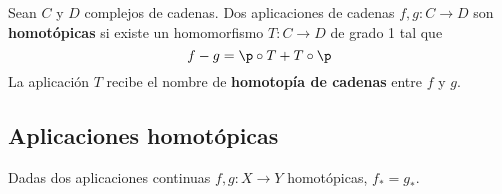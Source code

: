 \begin{definition}
Sean $C$ y $D$ complejos de cadenas. Dos aplicaciones de cadenas
$f,g\colon C \to D$ son \textbf{homotópicas} si existe un homomorfismo $T\colon
C \to D$ de grado 1 tal que
\[f-g=\p \circ T+T\circ \p\]
La aplicación $T$ recibe el nombre de \textbf{homotopía de cadenas} entre $f$ y
$g$.
\end{definition}

\subsection{Aplicaciones homotópicas}
\begin{theorem}
Dadas dos aplicaciones continuas $f,g\colon X \to Y$ homotópicas, $f_*=g_*$.
\end{theorem}

